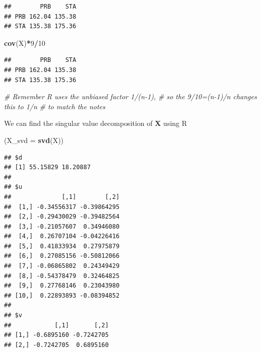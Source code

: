 \documentclass[]{book}
\newenvironment{Shaded}{\begin{snugshade}}{\end{snugshade}}
\newcommand{\CommentTok}[1]{\textcolor[rgb]{0.56,0.35,0.01}{\textit{#1}}}
\newcommand{\DataTypeTok}[1]{\textcolor[rgb]{0.13,0.29,0.53}{#1}}
\newcommand{\DecValTok}[1]{\textcolor[rgb]{0.00,0.00,0.81}{#1}}
\newcommand{\KeywordTok}[1]{\textcolor[rgb]{0.13,0.29,0.53}{\textbf{#1}}}
\newcommand{\NormalTok}[1]{#1}
\newcommand{\OperatorTok}[1]{\textcolor[rgb]{0.81,0.36,0.00}{\textbf{#1}}}
\newcommand{\StringTok}[1]{\textcolor[rgb]{0.31,0.60,0.02}{#1}}
\theoremstyle{definition}
\theoremstyle{definition}
\theoremstyle{definition}
\theoremstyle{remark}
\begin{document}
\begin{Shaded}
\end{Shaded}

\begin{verbatim}
##        PRB    STA
## PRB 162.04 135.38
## STA 135.38 175.36
\end{verbatim}

\begin{Shaded}
\begin{Highlighting}[]
\KeywordTok{cov}\NormalTok{(X)}\OperatorTok{*}\DecValTok{9}\OperatorTok{/}\DecValTok{10} 
\end{Highlighting}
\end{Shaded}

\begin{verbatim}
##        PRB    STA
## PRB 162.04 135.38
## STA 135.38 175.36
\end{verbatim}

\begin{Shaded}
\begin{Highlighting}[]
\CommentTok{# Remember R uses the unbiased factor 1/(n-1), }
\CommentTok{# so the 9/10=(n-1)/n changes this to 1/n }
\CommentTok{# to match the notes}
\end{Highlighting}
\end{Shaded}

We can find the singular value decomposition of \(\boldsymbol X\) using R

\begin{Shaded}
\begin{Highlighting}[]
\NormalTok{(}\DataTypeTok{X_svd =} \KeywordTok{svd}\NormalTok{(X))}
\end{Highlighting}
\end{Shaded}

\begin{verbatim}
## $d
## [1] 55.15829 18.20887
## 
## $u
##              [,1]        [,2]
##  [1,] -0.34556317 -0.39864295
##  [2,] -0.29430029 -0.39482564
##  [3,] -0.21057607  0.34946080
##  [4,]  0.26707104 -0.04226416
##  [5,]  0.41833934  0.27975879
##  [6,]  0.27085156 -0.50812066
##  [7,] -0.06865802  0.24349429
##  [8,] -0.54378479  0.32464825
##  [9,]  0.27768146  0.23043980
## [10,]  0.22893893 -0.08394852
## 
## $v
##            [,1]       [,2]
## [1,] -0.6895160 -0.7242705
## [2,] -0.7242705  0.6895160
\end{verbatim}
\end{document}
